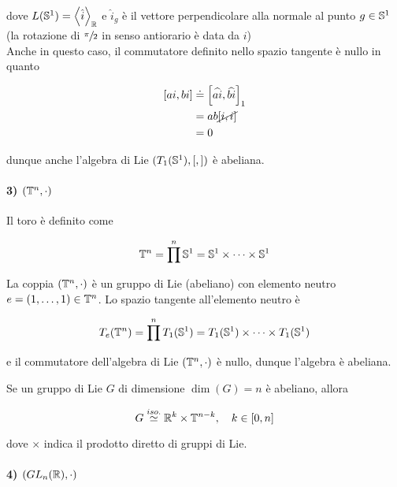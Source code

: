 dove $ L(\S^{1}) = \ev{\hat{i}}_{\R} $ e $ \hat{i}_{g} $ è il vettore perpendicolare alla normale al punto $ g \in \S^{1} $ (la rotazione di $ \sfrac{\pi}{2} $ in senso antiorario è data da $ i $)\\
Anche in questo caso, il commutatore definito nello spazio tangente è nullo in quanto

\begin{align}
	\begin{split}
		\comm{a i}{b i} &\doteq \comm{\widehat{a i}}{\widehat{b i}}_{1}\\
		&= a b \cancel{ \comm{i}{i} }\\
		&= 0
	\end{split}
\end{align}

dunque anche l'algebra di Lie $ (T_{1}(\S^{1}),[,]) $ è abeliana.

\paragraph{3) $ (\T^{n},\cdot) $}

Il toro è definito come

\begin{equation}
	\T^{n} = \prod^{n} \S^{1} = \S^{1} \times \cdots \times \S^{1}
\end{equation}

La coppia $ (\T^{n},\cdot) $ è un gruppo di Lie (abeliano) con elemento neutro $ e = (1,\dots,1) \in \T^{n} $. Lo spazio tangente all'elemento neutro è

\begin{equation}
	T_{e}(\T^{n}) = \prod^{n} T_{1}(\S^{1}) = T_{1}(\S^{1}) \times \cdots \times T_{1}(\S^{1})
\end{equation}

e il commutatore dell'algebra di Lie $ (\T^{n},\cdot) $ è nullo, dunque l'algebra è abeliana.

\begin{definition}
	Se un gruppo di Lie $ G $ di dimensione $ \dim(G) = n $ è abeliano, allora
	
	\begin{equation}
		G \stackrel{iso.}{\simeq} \R^{k} \times \T^{n-k} \qcomma k \in [0,n]
	\end{equation}

	dove $ \times $ indica il prodotto diretto di gruppi di Lie.
\end{definition}

\paragraph{4) $ (GL_{n}(\R),\cdot) $}

